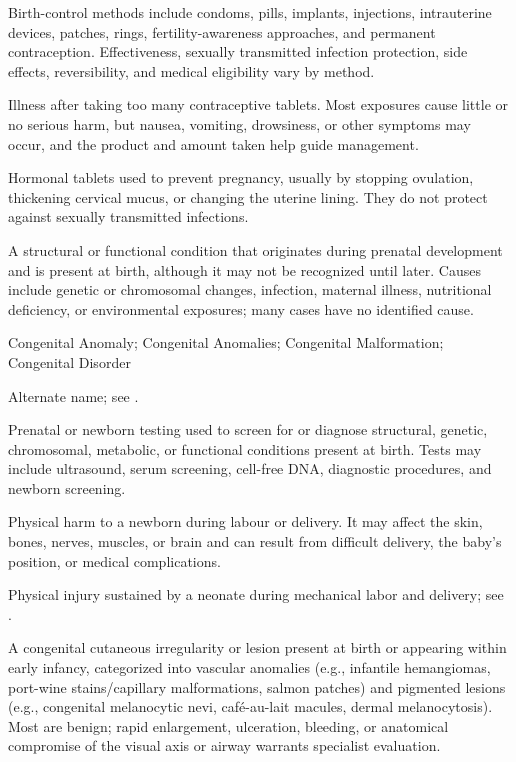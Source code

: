  Birth-control methods include condoms, pills, implants, injections, intrauterine devices, patches, rings, fertility-awareness approaches, and permanent contraception. Effectiveness, sexually transmitted infection protection, side effects, reversibility, and medical eligibility vary by method.

 Illness after taking too many contraceptive tablets. Most exposures cause little or no serious harm, but nausea, vomiting, drowsiness, or other symptoms may occur, and the product and amount taken help guide management.

 Hormonal tablets used to prevent pregnancy, usually by stopping ovulation, thickening cervical mucus, or changing the uterine lining. They do not protect against sexually transmitted infections.

 A structural or functional condition that originates during
prenatal development and is present at birth, although it may not be recognized until
later. Causes include genetic or chromosomal changes, infection, maternal illness,
nutritional deficiency, or environmental exposures; many cases have no identified cause.

\synonyms
Congenital Anomaly; Congenital Anomalies; Congenital Malformation; Congenital Disorder

 Alternate name; see .

 Prenatal or newborn testing used to screen for or diagnose structural, genetic, chromosomal, metabolic, or functional conditions present at birth. Tests may include ultrasound, serum screening, cell-free DNA, diagnostic procedures, and newborn screening.

 Physical harm to a newborn during labour or delivery. It may affect the skin, bones, nerves, muscles, or brain and can result from difficult delivery, the baby's position, or medical complications.

 Physical injury sustained by a neonate during mechanical labor and delivery; see .

 A congenital cutaneous irregularity or lesion present at birth or appearing within early infancy, categorized into vascular anomalies (e.g., infantile hemangiomas, port-wine stains/capillary malformations, salmon patches) and pigmented lesions (e.g., congenital melanocytic nevi, café-au-lait macules, dermal melanocytosis). Most are benign; rapid enlargement, ulceration, bleeding, or anatomical compromise of the visual axis or airway warrants specialist evaluation.

